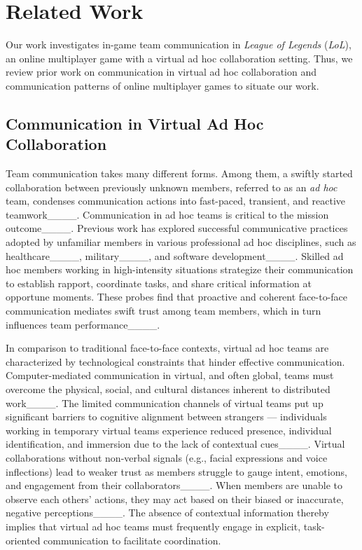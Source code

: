 \section{Related Work}
Our work investigates in-game team communication in \textit{League of Legends} (\textit{LoL}), an online multiplayer game with a virtual ad hoc collaboration setting. Thus, we review prior work on communication in virtual ad hoc collaboration and communication patterns of online multiplayer games to situate our work.


\subsection{Communication in Virtual Ad Hoc Collaboration}
Team communication takes many different forms. Among them, a swiftly started collaboration between previously unknown members, referred to as an \textit{ad hoc} team, condenses communication actions into fast-paced, transient, and reactive teamwork____. Communication in ad hoc teams is critical to the mission outcome____. Previous work has explored successful communicative practices adopted by unfamiliar members in various professional ad hoc disciplines, such as healthcare____, military____, and software development____. Skilled ad hoc members working in high-intensity situations strategize their communication to establish rapport, coordinate tasks, and share critical information at opportune moments. These probes find that proactive and coherent face-to-face communication mediates swift trust among team members, which in turn influences team performance____.

In comparison to traditional face-to-face contexts, virtual ad hoc teams are characterized by technological constraints that hinder effective communication. Computer-mediated communication in virtual, and often global, teams must overcome the physical, social, and cultural distances inherent to distributed work____. The limited communication channels of virtual teams put up significant barriers to cognitive alignment between strangers --- individuals working in temporary virtual teams experience reduced presence, individual identification, and immersion due to the lack of contextual cues____. Virtual collaborations without non-verbal signals (e.g., facial expressions and voice inflections) lead to weaker trust as members struggle to gauge intent, emotions, and engagement from their collaborators____. When members are unable to observe each others' actions, they may act based on their biased or inaccurate, negative perceptions____. The absence of contextual information thereby implies that virtual ad hoc teams must frequently engage in explicit, task-oriented communication to facilitate coordination.

